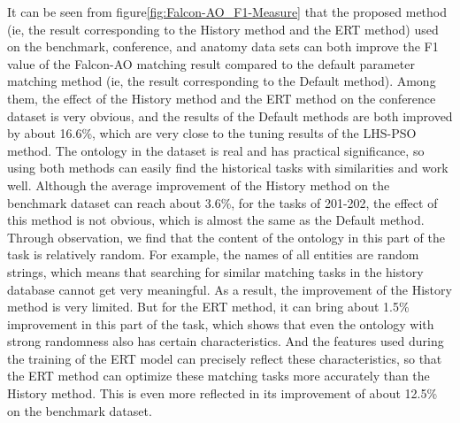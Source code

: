 \documentclass[twoside]{article}
\begin{document}
It can be seen from figure\ref{fig:Falcon-AO_F1-Measure} that the proposed method (ie, the result corresponding to the History method and the ERT method) used on the benchmark, conference, and anatomy data sets can both improve the F1 value of the Falcon-AO matching result compared to the default parameter matching method (ie, the result corresponding to the Default method).
Among them, the effect of the History method and the ERT method on the conference dataset is very obvious, and the results of the Default methods are both improved by about 16.6\%, which are very close to the tuning results of the LHS-PSO method. The ontology in the dataset is real and has practical significance, so using both methods can easily find the historical tasks with similarities and work well.
Although the average improvement of the History method on the benchmark dataset can reach about 3.6\%, for the tasks of 201-202, the effect of this method is not obvious, which is almost the same as the Default method.
Through observation, we find that the content of the ontology in this part of the task is relatively random. For example, the names of all entities are random strings, which means that searching for similar matching tasks in the history database cannot get very meaningful. As a result, the improvement of the History method is very limited.
But for the ERT method, it can bring about 1.5\% improvement in this part of the task, which shows that even the ontology with strong randomness also has certain characteristics. And the features used during the training of the ERT model can precisely reflect these characteristics, so that the ERT method can optimize these matching tasks more accurately than the History method.
This is even more reflected in its improvement of about 12.5\% on the benchmark dataset.
\end{document}
